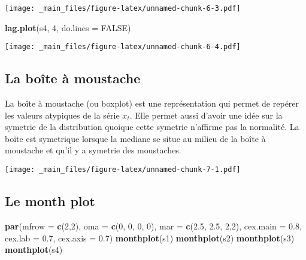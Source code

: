 \documentclass[
]{book}
\newenvironment{Shaded}{\begin{snugshade}}{\end{snugshade}}
\newcommand{\AttributeTok}[1]{\textcolor[rgb]{0.13,0.29,0.53}{#1}}
\newcommand{\ConstantTok}[1]{\textcolor[rgb]{0.56,0.35,0.01}{#1}}
\newcommand{\DecValTok}[1]{\textcolor[rgb]{0.00,0.00,0.81}{#1}}
\newcommand{\FloatTok}[1]{\textcolor[rgb]{0.00,0.00,0.81}{#1}}
\newcommand{\FunctionTok}[1]{\textcolor[rgb]{0.13,0.29,0.53}{\textbf{#1}}}
\newcommand{\NormalTok}[1]{#1}
\theoremstyle{definition}
\theoremstyle{definition}
\theoremstyle{definition}
\theoremstyle{definition}
\theoremstyle{remark}
\begin{document}
\texttt{[image: \_main\_files/figure-latex/unnamed-chunk-6-3.pdf]}

\begin{Shaded}
\begin{Highlighting}[]
\FunctionTok{lag.plot}\NormalTok{(s4, }\DecValTok{4}\NormalTok{, }\AttributeTok{do.lines =} \ConstantTok{FALSE}\NormalTok{)}
\end{Highlighting}
\end{Shaded}

\texttt{[image: \_main\_files/figure-latex/unnamed-chunk-6-4.pdf]}

\hypertarget{la-bouxeete-uxe0-moustache}{%
\subsection{La boîte à moustache}\label{la-bouxeete-uxe0-moustache}}

La boîte à moustache (ou boxplot) est une représentation qui permet de repérer les valeurs atypiques de la série \(x_t\). Elle permet aussi d'avoir une idée sur la symetrie de la distribution quoique cette symetrie n'affirme pas la normalité. La boite est symetrique lorsque la mediane se situe au milieu de la boîte à moustache et qu'il y a symetrie des moustaches.

\texttt{[image: \_main\_files/figure-latex/unnamed-chunk-7-1.pdf]}

\hypertarget{le-month-plot}{%
\subsection{Le month plot}\label{le-month-plot}}

\begin{Shaded}
\begin{Highlighting}[]
\FunctionTok{par}\NormalTok{(}\AttributeTok{mfrow =} \FunctionTok{c}\NormalTok{(}\DecValTok{2}\NormalTok{,}\DecValTok{2}\NormalTok{), }\AttributeTok{oma =} \FunctionTok{c}\NormalTok{(}\DecValTok{0}\NormalTok{, }\DecValTok{0}\NormalTok{, }\DecValTok{0}\NormalTok{, }\DecValTok{0}\NormalTok{), }\AttributeTok{mar =} \FunctionTok{c}\NormalTok{(}\FloatTok{2.5}\NormalTok{, }\FloatTok{2.5}\NormalTok{, }\DecValTok{2}\NormalTok{,}\DecValTok{2}\NormalTok{), }\AttributeTok{cex.main =} \FloatTok{0.8}\NormalTok{, }\AttributeTok{cex.lab =} \FloatTok{0.7}\NormalTok{, }\AttributeTok{cex.axis =} \FloatTok{0.7}\NormalTok{)}
\FunctionTok{monthplot}\NormalTok{(s1)}
\FunctionTok{monthplot}\NormalTok{(s2)}
\FunctionTok{monthplot}\NormalTok{(s3)}
\FunctionTok{monthplot}\NormalTok{(s4)}
\end{Highlighting}
\end{Shaded}
\end{document}
